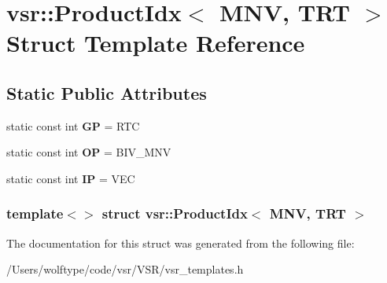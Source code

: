 \hypertarget{structvsr_1_1_product_idx_3_01_m_n_v_00_01_t_r_t_01_4}{\section{vsr\-:\-:Product\-Idx$<$ M\-N\-V, T\-R\-T $>$ Struct Template Reference}
\label{structvsr_1_1_product_idx_3_01_m_n_v_00_01_t_r_t_01_4}
}
\subsection*{Static Public Attributes}
\begin{DoxyCompactItemize}
\item 
\hypertarget{structvsr_1_1_product_idx_3_01_m_n_v_00_01_t_r_t_01_4_a1a0df05ab920b138cba887cf539ad207}{static const int {\bfseries G\-P} = R\-T\-C}\label{structvsr_1_1_product_idx_3_01_m_n_v_00_01_t_r_t_01_4_a1a0df05ab920b138cba887cf539ad207}

\item 
\hypertarget{structvsr_1_1_product_idx_3_01_m_n_v_00_01_t_r_t_01_4_a8202fb6b1c731a7f065a11f9ab6e3f0d}{static const int {\bfseries O\-P} = B\-I\-V\-\_\-\-M\-N\-V}\label{structvsr_1_1_product_idx_3_01_m_n_v_00_01_t_r_t_01_4_a8202fb6b1c731a7f065a11f9ab6e3f0d}

\item 
\hypertarget{structvsr_1_1_product_idx_3_01_m_n_v_00_01_t_r_t_01_4_a0ca3cb55a2835e9859b99cb94e11becb}{static const int {\bfseries I\-P} = V\-E\-C}\label{structvsr_1_1_product_idx_3_01_m_n_v_00_01_t_r_t_01_4_a0ca3cb55a2835e9859b99cb94e11becb}

\end{DoxyCompactItemize}
\subsubsection*{template$<$$>$ struct vsr\-::\-Product\-Idx$<$ M\-N\-V, T\-R\-T $>$}



The documentation for this struct was generated from the following file\-:\begin{DoxyCompactItemize}
\item 
/\-Users/wolftype/code/vsr/\-V\-S\-R/vsr\-\_\-templates.\-h\end{DoxyCompactItemize}

